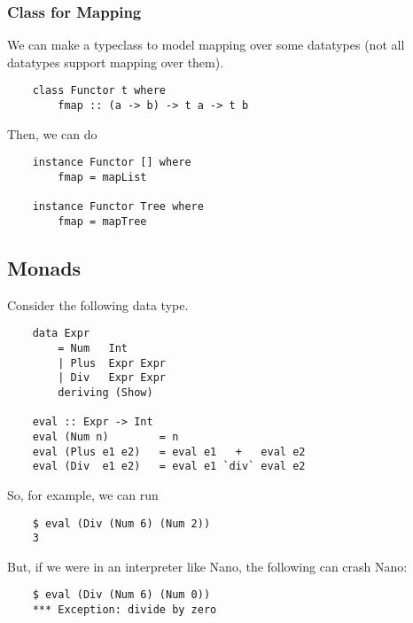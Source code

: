 \documentclass[letterpaper]{article}
\begin{document}
\subsubsection{Class for Mapping}
We can make a typeclass to model mapping over some datatypes (not all datatypes support mapping over them).

\begin{verbatim}
    class Functor t where 
        fmap :: (a -> b) -> t a -> t b\end{verbatim}

Then, we can do 
\begin{verbatim}
    instance Functor [] where 
        fmap = mapList 

    instance Functor Tree where 
        fmap = mapTree\end{verbatim}




\subsection{Monads}
Consider the following  data type. 
\begin{verbatim}
    data Expr 
        = Num   Int 
        | Plus  Expr Expr
        | Div   Expr Expr 
        deriving (Show) 
    
    eval :: Expr -> Int 
    eval (Num n)        = n
    eval (Plus e1 e2)   = eval e1   +   eval e2 
    eval (Div  e1 e2)   = eval e1 `div` eval e2\end{verbatim}

So, for example, we can run 
\begin{verbatim}
    $ eval (Div (Num 6) (Num 2))
    3 \end{verbatim}
But, if we were in an interpreter like Nano, the following can crash Nano: 
\begin{verbatim}
    $ eval (Div (Num 6) (Num 0))
    *** Exception: divide by zero \end{verbatim}
\end{document}

